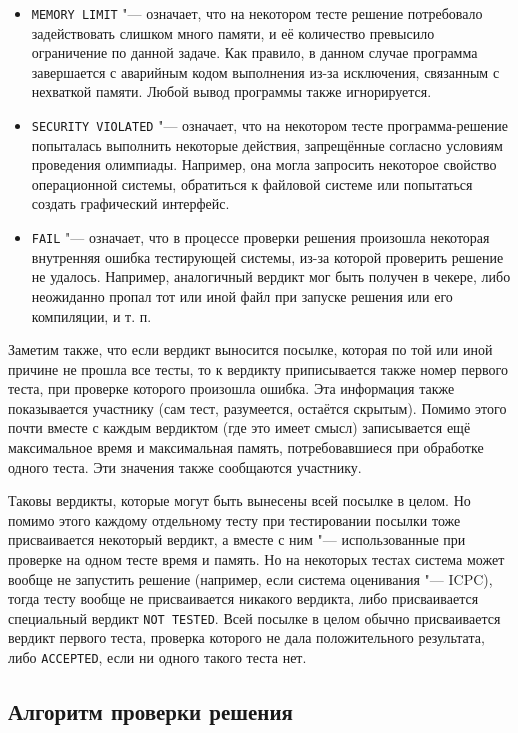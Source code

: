\begin{itemize}
\item \texttt{MEMORY LIMIT} "--- означает, что на некотором тесте решение потребовало задействовать слишком много памяти, и её количество превысило ограничение по данной задаче. Как правило, в данном случае программа завершается с аварийным кодом выполнения из-за исключения, связанным с нехваткой памяти. Любой вывод программы также игнорируется.
\item \texttt{SECURITY VIOLATED} "--- означает, что на некотором тесте программа-решение попыталась выполнить некоторые действия, запрещённые согласно условиям проведения олимпиады. Например, она могла запросить некоторое свойство операционной системы, обратиться к файловой системе или попытаться создать графический интерфейс.
\item \texttt{FAIL} "--- означает, что в процессе проверки решения произошла некоторая внутренняя ошибка тестирующей системы, из-за которой проверить решение не удалось. Например, аналогичный вердикт мог быть получен в чекере, либо неожиданно пропал тот или иной файл при запуске решения или его компиляции, и т. п.
\end{itemize}

Заметим также, что если вердикт выносится посылке, которая по той или иной причине не прошла все тесты, то к вердикту приписывается также номер первого теста, при проверке которого произошла ошибка. Эта информация также показывается участнику (сам тест, разумеется, остаётся скрытым). Помимо этого почти вместе с каждым вердиктом (где это имеет смысл) записывается ещё максимальное время и максимальная память, потребовавшиеся при обработке одного теста. Эти значения также сообщаются участнику.

Таковы вердикты, которые могут быть вынесены всей посылке в целом. Но помимо этого каждому отдельному тесту при тестировании посылки тоже присваивается некоторый вердикт, а вместе с ним "--- использованные при проверке на одном тесте время и память. Но на некоторых тестах система может вообще не запустить решение (например, если система оценивания "--- ICPC), тогда тесту вообще не присваивается никакого вердикта, либо присваивается специальный вердикт \texttt{NOT TESTED}. Всей посылке в целом обычно присваивается вердикт первого теста, проверка которого не дала положительного результата, либо \texttt{ACCEPTED}, если ни одного такого теста нет.

\subsection{Алгоритм проверки решения}

